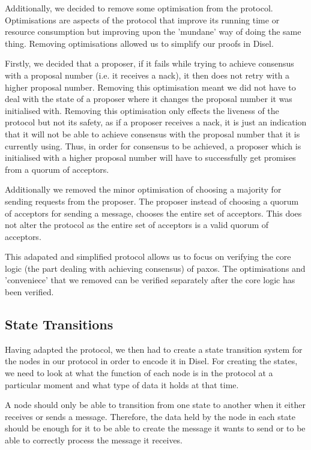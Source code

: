 Additionally, we decided to remove some optimisation from the protocol.
Optimisations are aspects of the protocol that improve its running time or
resource consumption but improving upon the 'mundane' way of doing the same
thing. Removing optimisations allowed us to simplify our proofs in Disel.

Firstly, we decided that a proposer, if it fails while trying to achieve
consensus with a proposal number (i.e. it receives a nack), it then does not
retry with a higher proposal number. Removing this optimisation meant we did not
have to deal with the state of a proposer where it changes the proposal number it
was initialised with. Removing this optimisation only
effects the liveness of the protocol but not its safety, as if a proposer
receives a nack, it is just an indication that it will not be able to achieve
consensus with the proposal number that it is currently using. Thus, in order
for consensus to be achieved, a proposer which is initialised with a higher
proposal number will have to successfully get promises from a quorum of acceptors.

Additionally we removed the minor optimisation of choosing a majority for
sending requests from the proposer. The proposer instead of choosing a
quorum of acceptors for sending a message, chooses the entire set of acceptors.
This does not alter the protocol as the entire set of acceptors is a valid
quorum of acceptors.

This adapated and simplified protocol allows us to focus on verifying the core
logic (the part dealing with achieving consensus) of paxos. The
optimisations and 'conveniece' that we removed can be verified separately after
the core logic has been verified.


\subsection{State Transitions}
Having adapted the protocol, we then had to create a state transition system for
the nodes in our protocol in order to encode it in Disel. For creating the states,
we need to look at what the function of each node is in the protocol at a particular
moment and what type of data it holds at that time.

A node should only be able to transition from one state to another when it either
receives or sends a message. Therefore, the data held by the node in each state
should be enough for it to be able to create the message it wants to send or to
be able to correctly process the message it receives.


